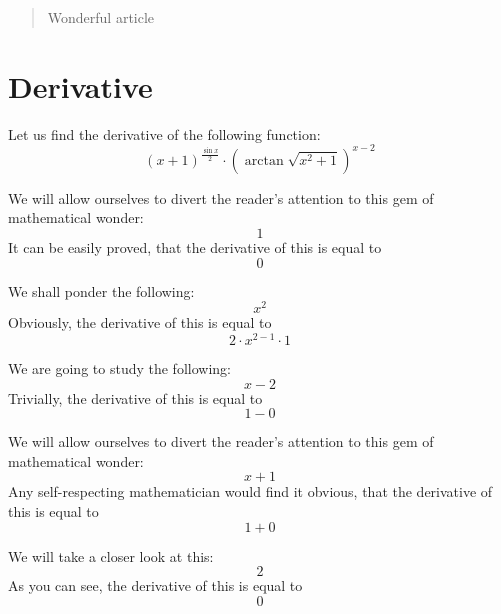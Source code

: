 \documentclass{article}
\begin{document}
\maketitle
\begin{abstract}
Wonderful article
\end{abstract}
\newpage
\section{Derivative}
Let us find the derivative of the following function:
\begin{equation}
\left( x + 1 \right) ^{\frac{\sin x }{2 } } \cdot \left( \arctan \sqrt {x ^{2 } + 1 } \right) ^{x - 2 } 
\end{equation}

We will allow ourselves to divert the reader's attention to this gem of mathematical wonder:
\begin{equation}
1 
\end{equation}
It can be easily proved, that the derivative of this is equal to
\begin{equation}
0 
\end{equation}

We shall ponder the following:
\begin{equation}
x ^{2 } 
\end{equation}
Obviously, the derivative of this is equal to
\begin{equation}
2 \cdot x ^{2 - 1 } \cdot 1 
\end{equation}

We are going to study the following:
\begin{equation}
x - 2 
\end{equation}
Trivially, the derivative of this is equal to
\begin{equation}
1 - 0 
\end{equation}

We will allow ourselves to divert the reader's attention to this gem of mathematical wonder:
\begin{equation}
x + 1 
\end{equation}
Any self-respecting mathematician would find it obvious, that the derivative of this is equal to
\begin{equation}
1 + 0 
\end{equation}

We will take a closer look at this:
\begin{equation}
2 
\end{equation}
As you can see, the derivative of this is equal to
\begin{equation}
0 
\end{equation}
\end{document}
